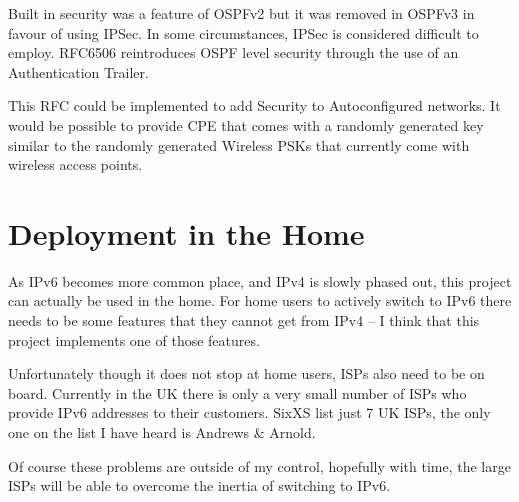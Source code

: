 \documentclass[12pt]{report}
\begin{document}
Built in security was a feature of OSPFv2 but it was removed in OSPFv3 in favour of 
using IPSec. In some circumstances, IPSec is considered difficult to employ. 
RFC6506 reintroduces OSPF level security through the use of an Authentication 
Trailer. 

This RFC could be implemented to add Security to Autoconfigured networks. It would 
be possible to provide CPE that comes with a randomly generated key similar to the 
randomly generated Wireless PSKs that currently come with wireless access points.

\section{Deployment in the Home}
As IPv6 becomes more common place, and IPv4 is slowly phased out, this project can 
actually be used in the home. For home users to actively switch to IPv6 there needs 
to be some features that they cannot get from IPv4 -- I think that this project 
implements one of those features.

Unfortunately though it does not stop at home users, ISPs also need to be on
board.  Currently in the UK there is only a very small number of ISPs who
provide IPv6 addresses to their customers. SixXS list just 7 UK ISPs, the only
one on the list I have heard is Andrews \& Arnold.

Of course these problems are outside of my control, hopefully with time, the
large ISPs will be able to overcome the inertia of switching to IPv6.
 
\pagebreak

\printnomenclature

\pagebreak

\cleardoublepage
{}
{}
{}



\end{document}
